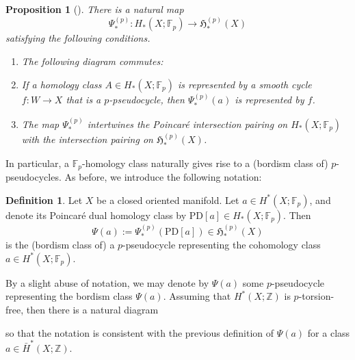 \documentclass[reqno]{amsart}
\numberwithin{equation}{section}
\numberwithin{equation}{section}
\numberwithin{equation}{section}
\newtheorem{prop}[thm]{Proposition}
\theoremstyle{definition}
\newtheorem{defn}[thm]{Definition}
\theoremstyle{remark}
\theoremstyle{remark}
\begin{document}
\begin{prop}[{\cite[Theorem A.3]{bai-pomerleano-xu}}]
    There is a natural map
    \begin{equation}
        \Psi_*^{(p)}: H_*(X;\mathbb{F}_p) \to \mathfrak{H}_*^{(p)}(X)
    \end{equation}
    satisfying the following conditions.
    \begin{enumerate}
        \item The following diagram commutes:
        \begin{center}
        \end{center}
        \item If a homology class $A \in H_*(X;\mathbb{F}_p)$ is represented by a smooth cycle $f: W \to X$ that is a $p$-pseudocycle, then $\Psi_*^{(p)}(a)$ is represented by $f$.
        \item The map $\Psi_*^{(p)}$ intertwines the Poincar\'e intersection pairing on $H_*(X;\mathbb{F}_p)$ with the intersection pairing on $\mathfrak{H}_*^{(p)}(X)$.
    \end{enumerate}
\end{prop}

In particular, a $\mathbb{F}_p$-homology class naturally gives rise to a (bordism class of) $p$-pseudocycles. As before, we introduce the following notation:

\begin{defn}
    Let $X$ be a closed oriented manifold. Let $a \in H^*(X;\mathbb{F}_p)$, and denote its Poincar\'e dual homology class by $\mathrm{PD}[a] \in H_*(X;\mathbb{F}_p)$. Then
    \begin{equation}
        \Psi(a) := \Psi_*^{(p)}(\mathrm{PD}[a]) \in \mathfrak{H}_*^{(p)}(X)
    \end{equation}
    is the (bordism class of) a $p$-pseudocycle representing the cohomology class $a \in H^*(X;\mathbb{F}_p)$.
\end{defn}
By a slight abuse of notation, we may denote by $\Psi(a)$ some $p$-pseudocycle representing the bordism class $\Psi(a)$. Assuming that $H^*(X;\mathbb{Z})$ is $p$-torsion-free, then there is a natural diagram
\begin{center}
    

\end{center}
so that the notation is consistent with the previous definition of $\Psi(a)$ for a class $a \in \bar{H}^*(X;\mathbb{Z})$. 
\end{document}
